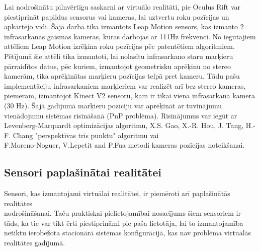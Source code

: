\documentclass[12pt, a4paper, oneside, openright]{article}
\begin{document}
\par
Lai nodrošinātu pilnvērtīgu saskarni ar virtuālo realitāti, pie Oculus Rift var piestiprināt papildus
sensorus vai kameras, lai uztvertu roku pozīcijas un apkārtējo vidi. Šajā darbā tika izmantots Leap Motion
sensors, kas izmanto 2 infrasarkanās gaismas kameras, kuras darbojas ar 111Hz frekvenci. 
No iegūtajiem attēliem Leap Motion izrēķina roku pozīcijas pēc patentētiem algoritmiem.
Pētījumā šie attēli tika izmantoti, lai nolasītu infrasarkano staru marķieru pārraidītos datus,
pēc kuriem, izmantojot ģeometrisku aprēķinu no stereo kamerām, tika aprēķinātas marķieru pozīcijas telpā
pret kameru. 
Tādu pašu implementāciju infrasarkaniem marķieriem var realizēt arī bez stereo kameras, piemēram,
izmantojot Kinect V2 sensoru, kam ir tikai viena infrasarkanā kamera (30 Hz). Šajā gadījumā
marķieru pozīciju var aprēķināt ar tuvinājumu vienādojumu sistēmas risināšanā (PnP problēma).
Risinājumus var iegūt ar Levenberg-Marquardt optimizācijas algoritmu, X.S. Gao, X.-R. Hou, J. Tang, H.-F. Chang "perspektīvas trīs punktu" algoritmu
vai \\ F.Moreno-Noguer, V.Lepetit and P.Fua metodi kameras pozīcijas noteikšanai.


\newpage
\subsection{Sensori paplašinātai realitātei}

\par
Sensori, kas izmantojami virtuālai realitātei, ir piemēroti arī paplašinātās realitātes \\
nodrošināšanai. Taču praktiskai pielietojamībai nosacījums šiem sensoriem ir tāds, ka tie var tikt ērti piestiprināmi pie
paša lietotāja, lai to izmantojamība netiktu ierobežota stacionārā sistēmas konfigurācijā,
kas nav problēma virtuālās realitātes gadījumā. 
\end{document}
